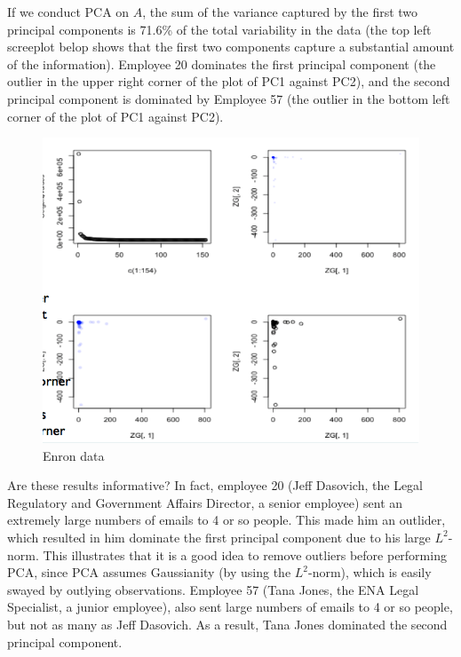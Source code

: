 If we conduct PCA on $A$, the sum of the variance captured by the first two principal components is 71.6\% of the total variability in the data (the top left screeplot belop shows that the first two components capture a substantial amount of the information). Employee 20 dominates the first principal component (the outlier in the upper right corner of the plot of PC1 against PC2), and the second principal component is dominated by Employee 57 (the outlier in the bottom left corner of the plot of PC1 against PC2).


\begin{figure}[H]
\begin{center}
\includegraphics[scale=0.5]{enron.png}
\end{center}
\caption{Enron data}
\label{fig:enron}
\end{figure}


Are these results informative? In fact, employee 20 (Jeff Dasovich, the Legal Regulatory and Government Affairs Director, a senior employee) sent an extremely large numbers of emails to 4 or so people. This made him an outlider, which resulted in him dominate the first principal component due to his large $L^2$-norm. This illustrates that it is a good idea to remove outliers before performing PCA, since PCA assumes Gaussianity (by using the $L^2$-norm), which is easily swayed by outlying observations. Employee 57 (Tana Jones, the ENA Legal Specialist, a junior employee), also sent large numbers of emails to 4 or so people, but not as many as Jeff Dasovich. As a result, Tana Jones dominated the second principal component. 

